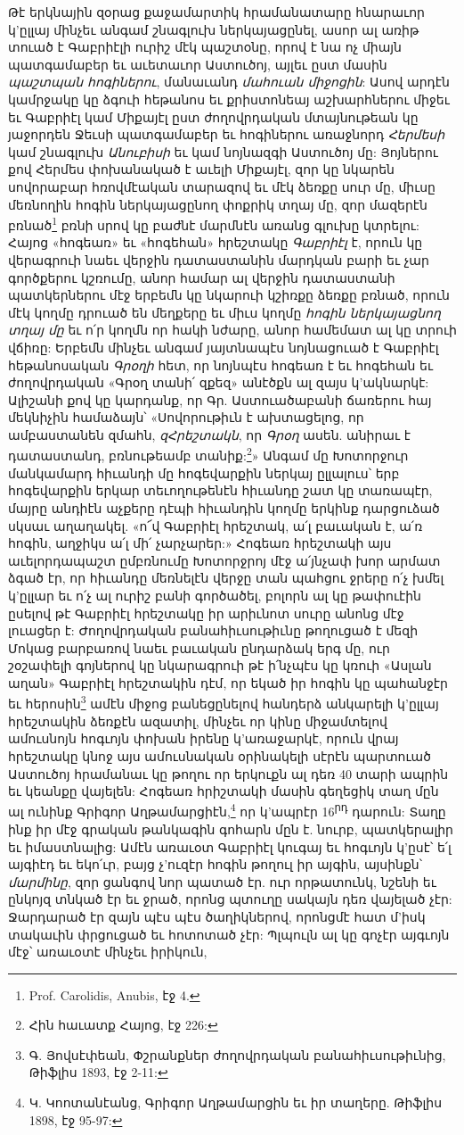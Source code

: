 \documentclass{article}
\begin{document}
{Թէ երկնային զօրաց քաջամարտիկ հրամանատարը հնարաւոր կ'ըլլայ մինչեւ անգամ շնագլուխ ներկայացընել, ասոր ալ առիթ տուած է Գաբրիէլի ուրիշ մէկ պաշտօնը, որով է նա ոչ միայն պատգամաբեր եւ աւետաւոր Աստուծոյ, այլեւ ըստ մասին \emph{պաշտպան հոգիներու}, մանաւանդ \emph{մահուան միջոցին}: Ասով արդէն կամրջակը կը ձգուի հեթանոս եւ քրիստոնեայ աշխարհներու միջեւ եւ Գաբրիէլ կամ Միքայէլ ըստ ժողովրդական մտայնութեան կը յաջորդեն Ջեւսի պատգամաբեր եւ հոգիներու առաջնորդ \emph{Հերմեսի} կամ շնագլուխ \emph{Անուբիսի} եւ կամ նոյնազգի Աստուծոյ մը: Յոյներու քով Հերմես փոխանակած է աւելի Միքայէլ, զոր կը նկարեն սովորաբար հռովմէական տարազով եւ մէկ ձեռքը սուր մը, միւսը մեռնողին հոգին ներկայացընող փոքրիկ տղայ մը, զոր մազերէն բռնած\footnote{Prof. Carolidis, Anubis, էջ 4.} բռնի սրով կը բաժնէ մարմնէն առանց գլուխը կտրելու: Հայոց «հոգեառ» եւ «հոգեհան» հրեշտակը \emph{Գաբրիէլ} է, որուն կը վերագրուի նաեւ վերջին դատաստանին մարդկան բարի եւ չար գործքերու կշռումը, անոր համար ալ վերջին դատաստանի պատկերներու մէջ երբեմն կը նկարուի կշիռքը ձեռքը բռնած, որուն մէկ կողմը դրուած են մեղքերը եւ միւս կողմը \emph{հոգին ներկայացնող տղայ մը} եւ ո՛ր կողմն որ հակի նժարը, անոր համեմատ ալ կը տրուի վճիռը: Երբեմն մինչեւ անգամ յայտնապէս նոյնացուած է Գաբրիէլ հեթանոսական \emph{Գրօղի} հետ, որ նոյնպէս հոգեառ է եւ հոգեհան եւ ժողովրդական «Գրօղ տանի՛ զքեզ» անէծքն ալ զայս կ'ակնարկէ: Ալիշանի քով կը կարդանք, որ Գր. Աստուածաբանի ճառերու հայ մեկնիչին համաձայն՝ «Սովորութիւն է ախտացելոց, որ ամբաստանեն զմահն, \emph{զՀրեշտակն}, որ \emph{Գրօղ} ասեն. անիրաւ է դատաստանդ, բռնութեամբ տանիք:\footnote{Հին հաւատք Հայոց, էջ 226:}» Անգամ մը Խոտորջուր մանկամարդ հիւանդի մը հոգեվարքին ներկայ ըլլալուս՝ երբ հոգեվարքին երկար տեւողութենէն հիւանդը շատ կը տառապէր, մայրը անդիէն աչքերը դէպի հիւանդին կողմը երկինք դարցուձած սկսաւ աղաղակել. «ո՜վ Գաբրիէլ հրեշտակ, ա՛լ բաւական է, ա՛ռ հոգին, աղջիկս ա՛լ մի՛ չարչարեր:» Հոգեառ հրեշտակի այս աւելորդապաշտ ըմբռնումը Խոտորջրոյ մէջ ա՛յնչափ խոր արմատ ձգած էր, որ հիւանդը մեռնելէն վերջը տան պահցու ջրերը ո՛չ խմել կ'ըլլար եւ ո՛չ ալ ուրիշ բանի գործածել, բոլորն ալ կը թափուէին ըսելով թէ Գաբրիէլ հրեշտակը իր արիւնոտ սուրը անոնց մէջ լուացեր է: Ժողովրդական բանահիւսութիւնը թողուցած է մեզի Մոկաց բարբառով նաեւ բաւական ընդարձակ երգ մը, ուր շօշափելի գոյներով կը նկարագրուի թէ ի՛նչպէս կը կռուի «Ասլան աղան» Գաբրիէլ հրեշտակին դէմ, որ եկած իր հոգին կը պահանջէր եւ հերոսին\footnote{Գ. Յովսէփեան, Փշրանքներ ժողովրդական բանահիւսութիւնից, Թիֆլիս 1893, էջ 2-11:} ամէն միջոց բանեցընելով հանդերձ անկարելի կ'ըլլայ հրեշտակին ձեռքէն ազատիլ, մինչեւ որ կինը միջամտելով ամուսնոյն հոգւոյն փոխան իրենը կ'առաջարկէ, որուն վրայ հրեշտակը կնոջ այս ամուսնական օրինակելի սէրէն պարտուած Աստուծոյ հրամանաւ կը թողու որ երկուքն ալ դեռ 40 տարի ապրին եւ կեանքը վայելեն: Հոգեառ հրիշտակի մասին գեղեցիկ տաղ մըն ալ ունինք Գրիգոր Աղթամարցիէն,\footnote{Կ. Կոոտանէանց, Գրիգոր Աղթամարցին եւ իր տաղերը. Թիֆլիս 1898, էջ 95-97:} որ կ'ապրէր 16\textsuperscript{րդ} դարուն: Տաղը ինք իր մէջ գրական թանկագին գոհարն մըն է. նուրբ, պատկերալիր եւ իմաստնալից: Ամէն առաւօտ Գաբրիէլ կուգայ եւ հոգւոյն կ'ըսէ՝ ե՛լ այգիէդ եւ եկո՛ւր, բայց չ'ուզէր հոգին թողուլ իր այգին, այսինքն՝ \emph{մարմինը}, զոր ցանգով նոր պատած էր. ուր որթատունկ, նշենի եւ ընկոյզ տնկած էր եւ ջրած, որոնց պտուղը սակայն դեռ վայելած չէր: Ջարդարած էր զայն պէս պէս ծաղիկներով, որոնցմէ հատ մ'իսկ տակաւին փրցուցած եւ հոտոտած չէր: Պլպուլն ալ կը գոչէր այգւոյն մէջ՝ առաւօտէ մինչեւ իրիկուն, }
\end{document}
